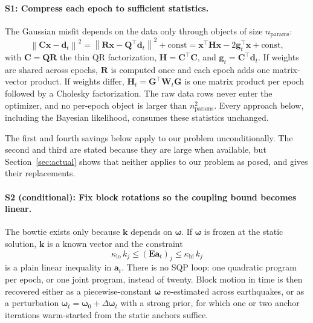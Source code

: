 \documentclass[11pt]{article}
\newcommand{\vect}[1]{\bm{#1}}
\newcommand{\mat}[1]{\mathbf{#1}}
\newcommand{\norm}[1]{\left\lVert #1 \right\rVert}
\begin{document}
\paragraph{S1: Compress each epoch to sufficient statistics.}
The Gaussian misfit depends on the data only through objects of size $n_{\mathrm{params}}$:
\begin{equation}
\norm{\mat{C}\vect{x} - \vect{d}_t}^2 = \norm{\mat{R}\vect{x} - \mat{Q}^{\!\top}\vect{d}_t}^2 + \text{const}
= \vect{x}^{\!\top}\mat{H}\vect{x} - 2\vect{g}_t^{\!\top}\vect{x} + \text{const},
\label{eq:suffstat}
\end{equation}
with $\mat{C} = \mat{Q}\mat{R}$ the thin QR factorization, $\mat{H} = \mat{C}^{\!\top}\mat{C}$, and $\vect{g}_t = \mat{C}^{\!\top}\vect{d}_t$. If weights are shared across epochs, $\mat{R}$ is computed once and each epoch adds one matrix-vector product. If weights differ, $\mat{H}_t = \mat{G}^{\!\top}\mat{W}_t\mat{G}$ is one matrix product per epoch followed by a Cholesky factorization. The raw data rows never enter the optimizer, and no per-epoch object is larger than $n_{\mathrm{params}}^2$. Every approach below, including the Bayesian likelihood, consumes these statistics unchanged.

The first and fourth savings below apply to our problem unconditionally. The second and third are stated because they are large when available, but Section~\ref{sec:actual} shows that neither applies to our problem as posed, and gives their replacements.

\paragraph{S2 (conditional): Fix block rotations so the coupling bound becomes linear.}
The bowtie exists only because $\vect{k}$ depends on $\vect{\omega}$. If $\vect{\omega}$ is frozen at the static solution, $\vect{k}$ is a known vector and the constraint
\begin{equation}
\kappa_{\mathrm{lo}}\, k_j \le (\mat{E}\vect{a}_t)_j \le \kappa_{\mathrm{hi}}\, k_j
\label{eq:linearbound}
\end{equation}
is a plain linear inequality in $\vect{a}_t$. There is no SQP loop: one quadratic program per epoch, or one joint program, instead of twenty. Block motion in time is then recovered either as a piecewise-constant $\vect{\omega}$ re-estimated across earthquakes, or as a perturbation $\vect{\omega}_t = \vect{\omega}_0 + \Delta\vect{\omega}_t$ with a strong prior, for which one or two anchor iterations warm-started from the static anchors suffice.
\end{document}

